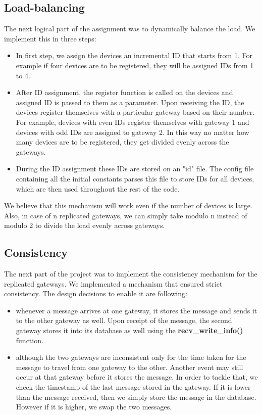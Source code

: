 \documentclass[12pt]{article}
\begin{document}
\subsection{Load-balancing}
The next logical part of the assignment was to
dynamically balance the load. 
We implement this in three steps: 
\begin{itemize}
	\item In first step, we assign the devices an 
	incremental ID that starts from 1. For example if four
	devices are to be registered, they will be assigned IDs from 1 to 4. 
	\item After ID assignment, the register function is called
	on the devices and assigned ID is passed to them as 
	a parameter. Upon receiving the ID, the devices register
	themselves with a particular gateway based on their number. For example, devices with even IDs register 
	themselves with gateway 1 and devices with odd IDs 
	are assigned to gateway 2. In this way no matter how 
	many devices are to be registered, they get divided 
	evenly across the gateways. 
	\item During the ID assignment these IDs are stored on 
	an "id" file. The config file containing all the initial 
	constants parses this file to store IDs for all devices, 
	which are then used throughout the rest of the code. 
\end{itemize}

We believe that this mechanism will work even if the number of devices is large. Also, in case of n replicated gateways, 
we can simply take modulo n instead of modulo 2 to 
divide the load evenly across gateways. 

\subsection{Consistency}
The next part of the project was to implement the consistency mechanism 
for the replicated gateways. We implemented a mechanism that ensured 
strict consistency. The design decisions to enable it are following:

\begin{itemize}
	\item whenever a message arrives at one gateway, it stores the message and sends it
	 to the other gateway as well. Upon receipt of the message, the second gateway stores 
	 it into its database as well using the \textbf{recv\_write\_info()} function. 
	 \item although the two gateways are inconsistent only for the time taken for the message to 
	 travel from one gateway to the other. Another event may still occur at that gateway before it stores the 
	 message. In order to tackle that, we check the timestamp of the last message stored in the gateway. 
	 If it is lower than the message received, then we simply store the message in the database. However 
	 if it is higher, we swap the two messages. 
\end{itemize}
\end{document}
